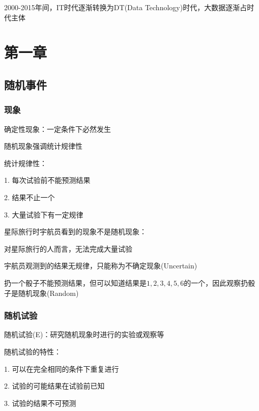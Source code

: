 2000-2015年间，IT时代逐渐转换为DT(Data Technology)时代，大数据逐渐占时代主体
\section{第一章}%
\label{sec:第一章}

\subsection{随机事件}%
\label{sub:随机事件}
\subsubsection{现象}%
\label{subsub:现象}
确定性现象：一定条件下必然发生

随机现象强调统计规律性

\begin{notation}
统计规律性：

1. 每次试验前不能预测结果

2. 结果不止一个

3. 大量试验下有一定规律
\end{notation}
\begin{eg}
    星际旅行时宇航员看到的现象不是随机现象：

    对星际旅行的人而言，无法完成大量试验

    宇航员观测到的结果无规律，只能称为不确定现象(Uncertain)
\end{eg}
\begin{eg}
    扔一个骰子不能预测结果，但可以知道结果是$1,2,3,4,5,6$的一个，因此观察扔骰子是随机现象(Random)
\end{eg}
\subsubsection{随机试验}%
\label{subsub:随机试验}
随机试验(E)：研究随机现象时进行的实验或观察等

\begin{notation}
    随机试验的特性：

    1. 可以在完全相同的条件下重复进行

    2. 试验的可能结果在试验前已知

    3. 试验的结果不可预测
\end{notation}
